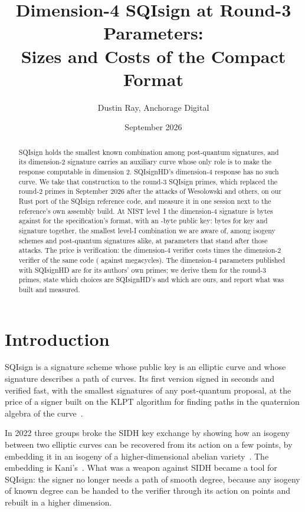 \documentclass[11pt]{article}
\title{Dimension-4 SQIsign at Round-3 Parameters:\\
Sizes and Costs of the Compact Format}
\author{Dustin Ray, Anchorage Digital}
\date{September 2026}
\begin{document}
\pagestyle{myheadings}
\maketitle

\begin{abstract}
SQIsign holds the smallest known combination among post-quantum
signatures, and its dimension-2 signature
carries an auxiliary curve whose only role is to make the response
computable in dimension 2.  SQIsignHD's dimension-4 response has no such
curve.  We take that construction to the round-3 SQIsign primes, which
replaced the round-2 primes in September 2026 after the attacks of
Wesolowski and others, on our Rust port of the SQIsign reference code, and
measure it in one session next to the reference's own assembly build.  At
NIST level~I the dimension-4 signature is \SigCompactI{} bytes against
\SigStdI{} for the specification's format, with an \PkCompactI-byte public
key: \ComboCompactI{} bytes for key and signature together, the smallest
level-I combination we are aware of, among isogeny schemes and
post-quantum signatures alike, at parameters that stand after those
attacks.  The price is verification: the dimension-4 verifier costs
\VerMultI{} times the dimension-2 verifier of the same code
(\VerCompactI{} against \VerStdI{} megacycles).  The dimension-4
parameters published with SQIsignHD are for its authors' own primes; we
derive them for the round-3 primes, state which choices are SQIsignHD's
and which are ours, and report what was built and measured.
\end{abstract}

\section{Introduction}
\label{sec:intro}

SQIsign is a signature scheme whose public key is an elliptic curve and
whose signature describes a path of curves.  Its first version signed in
seconds and verified fast, with the smallest signatures of any post-quantum
proposal, at the price of a signer built on the KLPT algorithm for finding
paths in the quaternion algebra of the curve~\cite{DKLPW20}.

In 2022 three groups broke the SIDH key exchange by showing how an isogeny
between two elliptic curves can be recovered from its action on a few
points, by embedding it in an isogeny of a higher-dimensional abelian
variety~\cite{CD23,MMPPW23,Rob23}.  The embedding is Kani's~\cite{Kan97}.
What was a weapon against SIDH became a tool for SQIsign: the signer no
longer needs a path of smooth degree, because any isogeny of known degree
can be handed to the verifier through its action on points and rebuilt in
a higher dimension.
\end{document}
